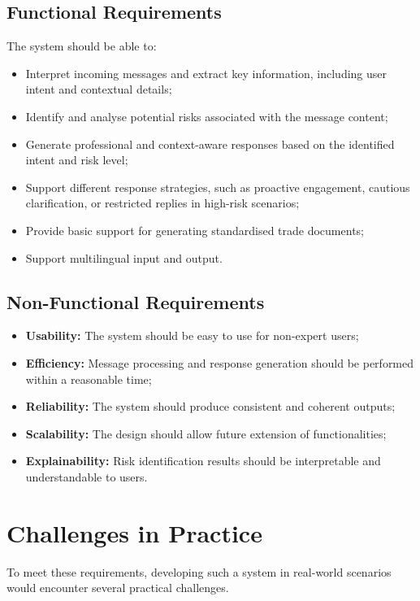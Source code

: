 \documentclass[12pt,a4paper]{report}
\begin{document}
\subsection{Functional Requirements}

The system should be able to:
\begin{itemize}
    \item Interpret incoming messages and extract key information, including user intent and contextual details;
    \item Identify and analyse potential risks associated with the message content;
    \item Generate professional and context-aware responses based on the identified intent and risk level;
    \item Support different response strategies, such as proactive engagement, cautious clarification, or restricted replies in high-risk scenarios;
    \item Provide basic support for generating standardised trade documents;
    \item Support multilingual input and output.
\end{itemize}

\subsection{Non-Functional Requirements}

\begin{itemize}
    \item \textbf{Usability:} The system should be easy to use for non-expert users;
    \item \textbf{Efficiency:} Message processing and response generation should be performed within a reasonable time;
    \item \textbf{Reliability:} The system should produce consistent and coherent outputs;
    \item \textbf{Scalability:} The design should allow future extension of functionalities;
    \item \textbf{Explainability:} Risk identification results should be interpretable and understandable to users.
\end{itemize}

\section{Challenges in Practice}

To meet these requirements, developing such a system in real-world scenarios would encounter several practical challenges.
\end{document}
